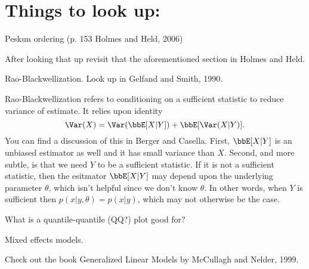 \documentclass{article}
\begin{document}
\section{Things to look up:}

\begin{outline}

\1 Peskun ordering (p. 153 Holmes and Held, 2006)

  \2 After looking that up revisit that the aforementioned section in Holmes and
  Held.

\1 Rao-Blackwellization.  Look up in Gelfand and Smith, 1990.

\2 Rao-Blackwellization refers to conditioning on a sufficient statistic to
reduce variance of estimate.  It relies upon identity
\[
\Var(X) = \Var(\bbE[X|Y]) + \bbE[\Var(X|Y)].
\]
You can find a discussion of this in Berger and Casella.  First, $\bbE[X|Y]$ is
an unbiased estimator as well and it has small variance than $X$.  Second, and
more subtle, is that we need $Y$ to be a sufficient statistic.  If it is not a
sufficient statistic, then the esitmator $\bbE[X|Y]$ may depend upon the
underlying parameter $\theta$, which isn't helpful since we don't know $\theta$.
In other words, when $Y$ is sufficient then $p(x | y, \theta) = p(x | y)$, which
may not otherwise be the case.


\1 What is a quantile-quantile (QQ?) plot good for?

\1 Mixed effects models.

\1 Check out the book Generalized Linear Models by McCullagh and Nelder, 1999.

\end{outline}

{}

\end{document}

